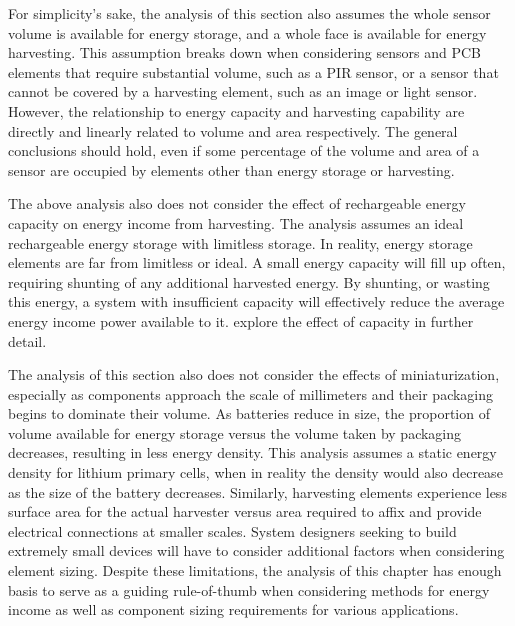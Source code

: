 For simplicity's sake, the analysis of this section also assumes the whole sensor volume is available for energy storage, and a whole face is available for energy harvesting.
This assumption breaks down when considering sensors and PCB elements that require substantial volume, such as a PIR sensor, or a sensor that cannot be covered by a harvesting element, such as an image or light sensor.
However, the relationship to energy capacity and harvesting capability are directly and linearly related to volume and area respectively. The general conclusions should hold, even if some percentage of the volume and area of a sensor are occupied by elements other than energy storage or harvesting.

The above analysis also does not consider the effect of rechargeable energy capacity on energy income from harvesting.
The analysis assumes an ideal rechargeable energy storage with limitless storage.
In reality, energy storage elements are far from limitless or ideal.
A small energy capacity will fill up often, requiring shunting of any additional harvested energy.
By shunting, or wasting this energy, a system with insufficient capacity will effectively reduce the average energy income power available to it. 
 explore the effect of capacity in further detail.

The analysis of this section also does not consider the effects of miniaturization, especially as components approach the scale of millimeters and their packaging begins to dominate their volume. As batteries reduce in size, the proportion of volume available for energy storage versus the volume taken by packaging decreases, resulting in less energy density. This analysis assumes a static energy density for lithium primary cells, when in reality the density would also decrease as the size of the battery decreases. Similarly, harvesting elements experience less surface area for the actual harvester versus area required to affix and provide electrical connections at smaller scales.
System designers seeking to build extremely small devices will have to consider additional factors when considering element sizing.
Despite these limitations, the analysis of this chapter has enough basis to serve as a guiding rule-of-thumb when considering methods for energy income as well as component sizing requirements for various applications.




